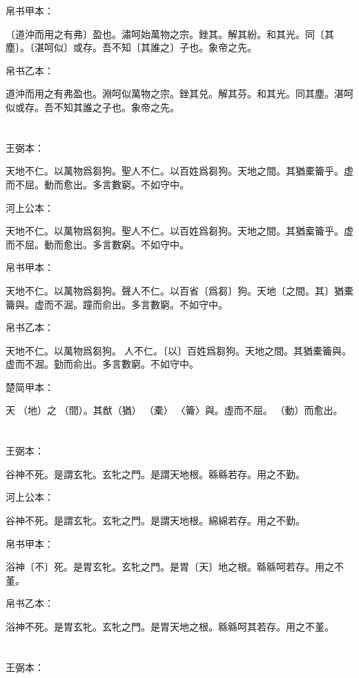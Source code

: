 \documentclass[a5paper]{ctexbook}
\begin{document}
    帛书甲本：

    〔道沖而用之有弗〕盈也。潚呵始萬物之宗。銼其。解其紛。和其光。同〔其塵〕。〔湛呵似〕或存。吾不知〔其誰之〕子也。象帝之先。

    帛书乙本：

    道沖而用之有弗盈也。淵呵似萬物之宗。銼其兑。解其芬。和其光。同其塵。湛呵似或存。吾不知其誰之子也。象帝之先。

    \chapter{}
    王弼本：

    天地不仁。以萬物爲芻狗。聖人不仁。以百姓爲芻狗。天地之間。其猶橐籥乎。虚而不屈。動而愈出。多言數窮。不如守中。

    河上公本：

    天地不仁。以萬物爲芻狗。聖人不仁。以百姓爲芻狗。天地之間。其猶槖籥乎。虚而不屈。動而愈出。多言數窮。不如守中。

    帛书甲本：

    天地不仁。以萬物爲芻狗。聲人不仁。以百省〔爲芻〕狗。天地〔之間。其〕猶橐籥與。虚而不淈。蹱而俞出。多言數窮。不如守中。

    帛书乙本：

    天地不仁。以萬物爲芻狗。𦔻人不仁。〔以〕百姓爲芻狗。天地之間。其猶橐籥與。虚而不淈。勭而俞出。多言數窮。不如守中。

    楚简甲本：

    天󶴵（地）之󶵁（間）。其猷（猶）󶵂（橐）󶵃〈籥〉與。虛而不屈。󶴠（動）而愈出。

    \chapter{}
    王弼本：

    谷神不死。是謂玄牝。玄牝之門。是謂天地根。緜緜若存。用之不勤。

    河上公本：

    谷神不死。是謂玄牝。玄牝之門。是謂天地根。綿綿若存。用之不勤。

    帛书甲本：

    浴神〔不〕死。是胃玄牝。玄牝之門。是胃〔天〕地之根。緜緜呵若存。用之不堇。

    帛书乙本：

    浴神不死。是胃玄牝。玄牝之門。是胃天地之根。緜緜呵其若存。用之不堇。

    \chapter{}
    王弼本：
\end{document}
